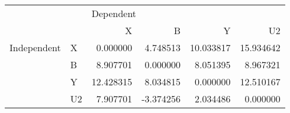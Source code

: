\begin{tabular}{llrrrr}
\toprule
            &    & \multicolumn{4}{l}{Dependent} \\
            &    &          X &         B &          Y &         U2 \\
\midrule
Independent & X &   0.000000 &  4.748513 &  10.033817 &  15.934642 \\
            & B &   8.907701 &  0.000000 &   8.051395 &   8.967321 \\
            & Y &  12.428315 &  8.034815 &   0.000000 &  12.510167 \\
            & U2 &   7.907701 & -3.374256 &   2.034486 &   0.000000 \\
\bottomrule
\end{tabular}

